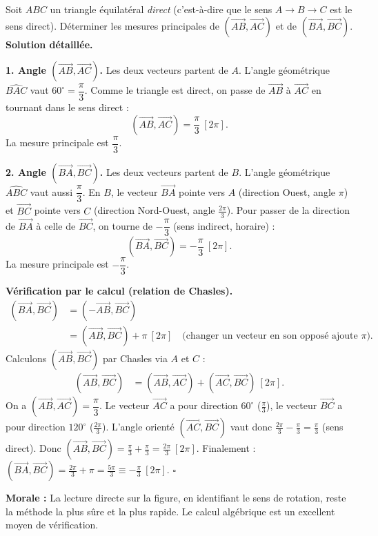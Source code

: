\documentclass[11pt]{article}
\begin{document}
\begin{exoresolu}
Soit $ABC$ un triangle équilatéral \emph{direct} (c'est-à-dire que le sens $A \to B \to C$ est le sens direct). Déterminer les mesures principales de $(\overrightarrow{AB}, \overrightarrow{AC})$ et de $(\overrightarrow{BA}, \overrightarrow{BC})$.
\tcblower
\textbf{Solution détaillée.}

\textbf{1. Angle $(\overrightarrow{AB}, \overrightarrow{AC})$.} Les deux vecteurs partent de $A$. L'angle géométrique $\widehat{BAC}$ vaut $60^\circ = \dfrac{\pi}{3}$. Comme le triangle est direct, on passe de $\overrightarrow{AB}$ à $\overrightarrow{AC}$ en tournant dans le sens direct :
\[ (\overrightarrow{AB}, \overrightarrow{AC}) = \frac{\pi}{3} \ [2\pi]. \]
La mesure principale est $\dfrac{\pi}{3}$.

\textbf{2. Angle $(\overrightarrow{BA}, \overrightarrow{BC})$.} Les deux vecteurs partent de $B$. L'angle géométrique $\widehat{ABC}$ vaut aussi $\dfrac{\pi}{3}$. En $B$, le vecteur $\overrightarrow{BA}$ pointe vers $A$ (direction Ouest, angle $\pi$) et $\overrightarrow{BC}$ pointe vers $C$ (direction Nord-Ouest, angle $\frac{2\pi}{3}$). Pour passer de la direction de $\overrightarrow{BA}$ à celle de $\overrightarrow{BC}$, on tourne de $-\dfrac{\pi}{3}$ (sens indirect, horaire) :
\[ (\overrightarrow{BA}, \overrightarrow{BC}) = -\frac{\pi}{3} \ [2\pi]. \]
La mesure principale est $-\dfrac{\pi}{3}$.

\textbf{Vérification par le calcul (relation de Chasles).}
\begin{align*}
(\overrightarrow{BA}, \overrightarrow{BC}) &= (-\overrightarrow{AB}, \overrightarrow{BC}) \\
&= (\overrightarrow{AB}, \overrightarrow{BC}) + \pi \ [2\pi] \quad \text{(changer un vecteur en son opposé ajoute $\pi$)}.
\end{align*}
Calculons $(\overrightarrow{AB}, \overrightarrow{BC})$ par Chasles via $A$ et $C$ :
\begin{align*}
(\overrightarrow{AB}, \overrightarrow{BC}) &= (\overrightarrow{AB}, \overrightarrow{AC}) + (\overrightarrow{AC}, \overrightarrow{BC}) \ [2\pi].
\end{align*}
On a $(\overrightarrow{AB}, \overrightarrow{AC}) = \dfrac{\pi}{3}$. Le vecteur $\overrightarrow{AC}$ a pour direction $60^\circ$ ($\frac{\pi}{3}$), le vecteur $\overrightarrow{BC}$ a pour direction $120^\circ$ ($\frac{2\pi}{3}$). L'angle orienté $(\overrightarrow{AC}, \overrightarrow{BC})$ vaut donc $\frac{2\pi}{3} - \frac{\pi}{3} = \frac{\pi}{3}$ (sens direct).
Donc $(\overrightarrow{AB}, \overrightarrow{BC}) = \frac{\pi}{3} + \frac{\pi}{3} = \frac{2\pi}{3} \ [2\pi]$.
Finalement : $(\overrightarrow{BA}, \overrightarrow{BC}) = \frac{2\pi}{3} + \pi = \frac{5\pi}{3} \equiv -\frac{\pi}{3} \ [2\pi]$. \quad $\square$

\textbf{Morale :} La lecture directe sur la figure, en identifiant le sens de rotation, reste la méthode la plus sûre et la plus rapide. Le calcul algébrique est un excellent moyen de vérification.
\end{exoresolu}
\end{document}
